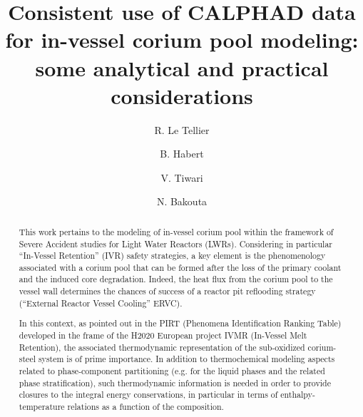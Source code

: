 \documentclass[3p]{elsarticle}
\begin{document}
\begin{frontmatter}
\title{Consistent use of CALPHAD data for in-vessel corium pool modeling: \\ some analytical and practical considerations}
\author[address]{R. Le Tellier} 
\author[address]{B. Habert}  
\author[address]{V. Tiwari}  
\author[addressEDF]{N. Bakouta}

\address[address]{CEA, DEN, DTN/SMTA/LMAG, Cadarache \\
  F-13108 Saint Paul-lez-Durance, France}
\address[addressEDF]{EDF Lab Paris-Saclay \\
  7, boulevard Gaspard Monge \\
  F-91120, Palaiseau, France}
\begin{abstract} 

This work pertains to the modeling of in-vessel corium pool within the framework of Severe Accident studies for Light Water Reactors (LWRs). Considering in particular ``In-Vessel Retention'' (IVR) safety strategies, a key element is the phenomenology associated with a corium pool that can be formed after the loss of the primary coolant and the induced core degradation. Indeed, the heat flux from the corium pool to the vessel wall determines the chances of success of a reactor pit reflooding strategy (``External Reactor Vessel Cooling'' ERVC). %

In this context, as pointed out in the PIRT (Phenomena Identification Ranking Table) developed in the frame of the H2020 European project IVMR (In-Vessel Melt Retention), the associated thermodynamic representation of the sub-oxidized corium-steel system is of prime importance. In addition to thermochemical modeling aspects related to phase-component partitioning (e.g. for the liquid phases and the related phase stratification), such thermodynamic information is needed in order to provide closures to the integral energy conservations, in particular in terms of enthalpy-temperature relations as a function of the composition.


\end{abstract}
\end{frontmatter}
\end{document}
